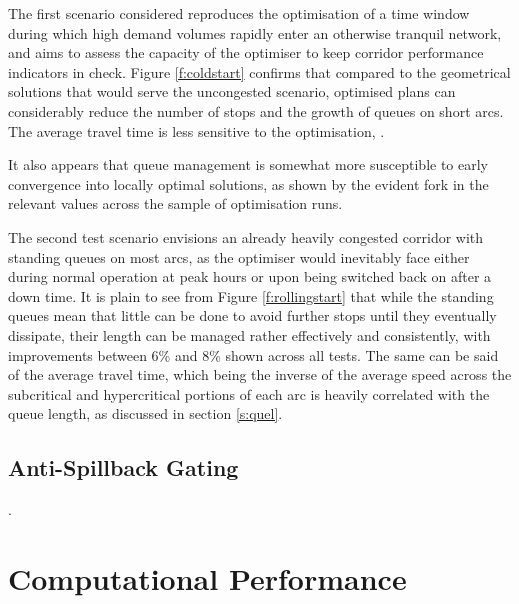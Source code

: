 The first scenario considered reproduces the optimisation of a time window during which high demand volumes rapidly enter an otherwise tranquil network, and aims to assess the capacity of the optimiser to keep corridor performance indicators in check. Figure \ref{f:coldstart} confirms that compared to the geometrical solutions that would serve the uncongested scenario, optimised plans can considerably reduce the number of stops and the growth of queues on short arcs. The average travel time is less sensitive to the optimisation, .


It also appears that queue management is somewhat more susceptible to early convergence into locally optimal solutions, as shown by the evident fork in the relevant values across the sample of optimisation runs.

The second test scenario envisions an already heavily congested  corridor with standing queues on most arcs, as the optimiser would inevitably face either during normal operation at peak hours or upon being switched back on after a down time. It is plain to see from Figure \ref{f:rollingstart} that while the standing queues mean that little can be done to avoid further stops until they eventually dissipate, their length can be managed rather effectively and consistently, with improvements between 6\% and 8\% shown across all tests. The same can be said of the average travel time, which being the inverse of the average speed across the subcritical and hypercritical portions of each arc is heavily correlated with the queue length, as discussed in section \ref{s:quel}.





\subsection{Anti-Spillback Gating}
.


\section{Computational Performance}

